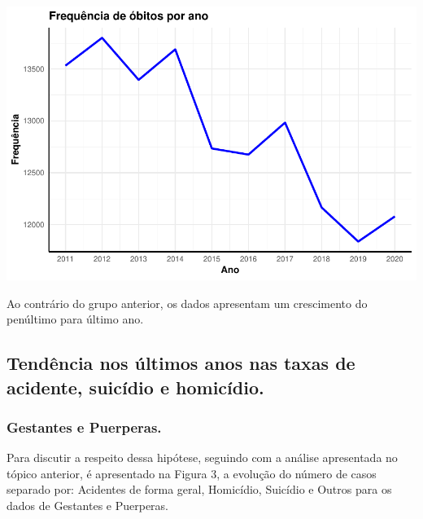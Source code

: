 \documentclass[
]{article}
\let\origfigure\figure
\let\endorigfigure\endfigure
\renewenvironment{figure}[1][2] {
    \expandafter\origfigure\expandafter[H]
} {
    \endorigfigure
}
\begin{document}
\begin{figure}
\centering
\includegraphics{RelatorioV02_files/figure-latex/unnamed-chunk-5-1.pdf}
\caption{Frequência de obitos por ano grupo Mulheres em Período Fértil}
\end{figure}

Ao contrário do grupo anterior, os dados apresentam um crescimento do
penúltimo para último ano.

\hypertarget{tenduxeancia-nos-uxfaltimos-anos-nas-taxas-de-acidente-suicuxeddio-e-homicuxeddio.}{%
\subsection{Tendência nos últimos anos nas taxas de acidente, suicídio e
homicídio.}\label{tenduxeancia-nos-uxfaltimos-anos-nas-taxas-de-acidente-suicuxeddio-e-homicuxeddio.}}

\hypertarget{gestantes-e-puerperas.}{%
\subsubsection{Gestantes e Puerperas.}\label{gestantes-e-puerperas.}}

Para discutir a respeito dessa hipótese, seguindo com a análise
apresentada no tópico anterior, é apresentado na Figura 3, a evolução do
número de casos separado por: Acidentes de forma geral, Homicídio,
Suicídio e Outros para os dados de Gestantes e Puerperas.
\end{document}
